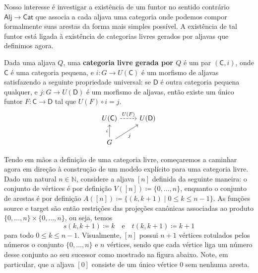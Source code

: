 Nosso interesse é investigar a existência de um funtor no sentido contrário $\mathsf{Alj} \to \mathsf{Cat}$ que associa a cada aljava uma categoria onde podemos compor formalmente suas arestas da forma mais simples possível.
A existência de tal funtor está ligada à existência de categorias livres gerados por aljavas que definimos agora.

\begin{defin}\label{defin:categoria_livre}
    Dada uma aljava $Q$, uma \textbf{categoria livre gerada por $Q$} é um par $(\mathsf{C},i)$, onde $\mathsf{C}$ é uma categoria pequena, e $i: G \to U(\mathsf{C})$ é um morfismo de aljavas satisfazendo a seguinte propriedade universal: se $\mathsf{D}$ é outra categoria pequena qualquer, e $j: G \to U(\mathsf{D})$ é um morfismo de aljavas, então existe um único funtor $F: \mathsf{C} \to \mathsf{D}$ tal que $U(F) \circ i = j$.
    \begin{displaymath}
        \begin{tikzcd}
            U(\mathsf{C})
            \arrow[r, dashed, "U(F)"]
            & U(\mathsf{D})
            \\ G
            \arrow[u, "i"]
            \arrow[ru, "j" swap]
        \end{tikzcd}
    \end{displaymath}
\end{defin}

Tendo em mãos a definição de uma categoria livre, começaremos a caminhar agora em direção à construção de um modelo explícito para uma categoria livre.
Dado um natural $n \in \mathbb{N}$, considere a aljava $[n]$ definida da seguinte maneira: o conjunto de vértices é por definição $V([n]) \coloneqq \{0,\dots,n\}$, enquanto o conjunto de arestas é por definição $A([n]) \coloneqq \{(k,k+1) \mid 0 \leq k \leq n-1\}$.
As funções source e target são então restrições das projeções canônicas associadas ao produto $\{0,\dots,n\} \times \{0,\dots,n\}$, ou seja, temos
\begin{displaymath}
    s(k,k+1) \coloneqq k
    \quad \text{e} \quad
    t(k,k+1) \coloneqq k+1
\end{displaymath}
para todo $0 \leq k \leq n-1$.
Visualmente, $[n]$ possui $n+1$ vértices rotulados pelos números o conjunto $\{0,\dots,n\}$ e $n$ vértices, sendo que cada vértice liga um número desse conjunto ao seu sucessor como mostrado na figura abaixo.
Note, em particular, que a aljava $[0]$ consiste de um único vértice $0$ sem nenhuma aresta.

